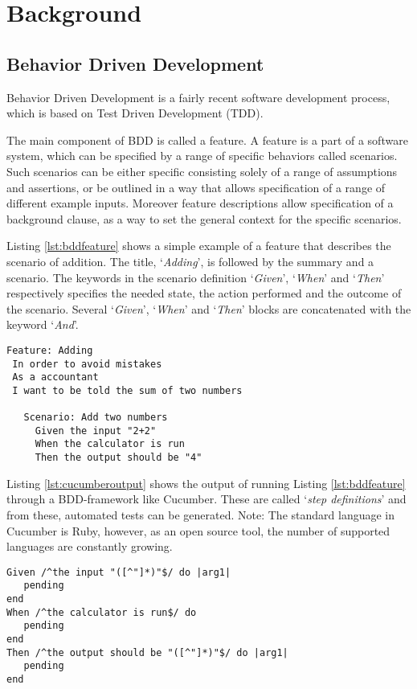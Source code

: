 \section{Background}
\label{sec:Background}

\subsection{Behavior Driven Development}
\label{sub:bdd}
Behavior Driven Development is a fairly recent software development process, which is 
based on Test Driven Development (TDD).

The main component of BDD is called a feature. 
A feature is a part of a software system,
which can be specified by a range of specific behaviors called scenarios.
Such scenarios can be either specific consisting solely of a range of
assumptions and assertions, or be outlined in a way that allows
specification of a range of different example inputs.
Moreover feature descriptions allow specification of a background clause,
as a way to set the general context for the specific scenarios.

Listing \ref{lst:bddfeature} shows a simple example of a feature that describes the scenario of addition. 
The title, `\emph{Adding}', is followed by the summary and a scenario. The keywords in the scenario definition `\emph{Given}', `\emph{When}' and `\emph{Then}' respectively specifies the needed state, the action performed and the outcome of the scenario. 
Several `\emph{Given}', `\emph{When}' and `\emph{Then}' blocks are concatenated with the keyword `\emph{And}'.

\begin{lstlisting}[caption={Sample Addition Feature},label={lst:bddfeature}]
Feature: Adding
 In order to avoid mistakes 
 As a accountant
 I want to be told the sum of two numbers

   Scenario: Add two numbers
     Given the input "2+2"
     When the calculator is run 
     Then the output should be "4"
\end{lstlisting}

Listing \ref{lst:cucumberoutput} shows the output of running Listing \ref{lst:bddfeature} through a BDD-framework like Cucumber.
These are called `\emph{step definitions}' and from these, automated tests can be generated. 
Note: The standard language in Cucumber is Ruby, however, as an open source tool, the number of supported languages are constantly growing. 

\begin{lstlisting}[caption={Sample Cucumber Output},label={lst:cucumberoutput}]
Given /^the input "([^"]*)"$/ do |arg1|
   pending
end
When /^the calculator is run$/ do
   pending
end
Then /^the output should be "([^"]*)"$/ do |arg1|
   pending
end
\end{lstlisting}


